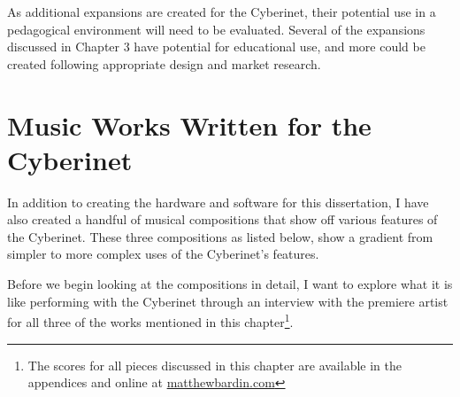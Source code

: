 As additional expansions are created for the Cyberinet, their potential use in a pedagogical environment will need to be evaluated. Several of the expansions discussed in Chapter 3 have potential for educational use, and more could be created following appropriate design and market research.

\chapter{Music Works Written for the Cyberinet}

In addition to creating the hardware and software for this dissertation, I have also created a handful of musical compositions that show off various features of the Cyberinet. These three compositions as listed below, show a gradient from simpler to more complex uses of the Cyberinet’s features.

Before we begin looking at the compositions in detail, I want to explore what it is like performing with the Cyberinet through an interview with the premiere artist for all three of the works mentioned in this chapter\footnote{The scores for all pieces discussed in this chapter are available in the appendices and online at \url{matthewbardin.com}}.





